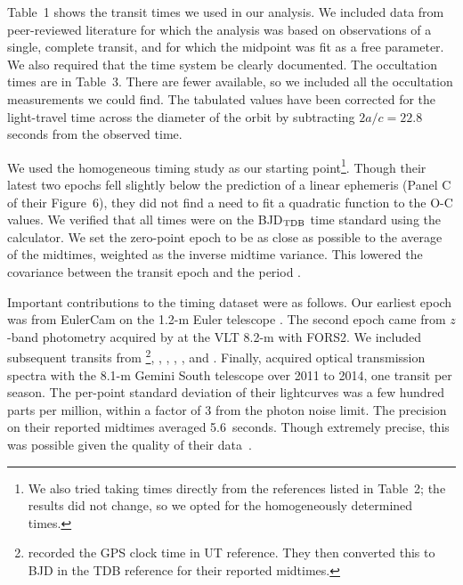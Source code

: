 \documentclass[12pt,twocolumn,tighten]{aastex62}
\begin{document}
Table~1 shows the transit times we used in our analysis.  We included
data from peer-reviewed literature for which the analysis was based on
observations of a single, complete transit, and for which the midpoint
was fit as a free parameter. We also required that the time system be
clearly documented.  The occultation times are in Table~3.  There are
fewer available, so we included all the occultation measurements we
could find. The tabulated values have been corrected for the
light-travel time across the diameter of the orbit by subtracting
$2a/c = 22.8$ seconds from the observed time.

We used the homogeneous \citet{hoyer_tramos_2013} timing study as our
starting point\footnote{We also tried taking times directly from the
references listed in Table~2; the results did not change, so we opted
for the homogeneously determined \citet{hoyer_tramos_2013} times.}.
Though their latest two epochs fell slightly below the prediction of a
linear ephemeris (Panel C of their Figure~6), they did not find a need
to fit a quadratic function to the O-C values.  We verified that all
times were on the BJD$_{\rm TDB}$ time standard using the
\citet{eastman_achieving_2010} calculator.  We set the zero-point
epoch to be as close as possible to the average of the midtimes,
weighted as the inverse midtime variance. This lowered the
covariance between the transit epoch and the period
\citep{gibson_gemini_2013}.

Important contributions to the timing dataset were as follows.  Our
earliest epoch was from EulerCam on the 1.2-m Euler telescope
\citep{wilson_wasp-4b_2008}.  The second epoch came from $z$-band
photometry acquired by \citet{gillon_improved_2009} at the VLT 8.2-m
with FORS2.  We included subsequent transits from
\citet{winn_transit_2009}\footnote{\citet{winn_transit_2009} recorded
the GPS clock time in UT reference. They then converted this to BJD in
the TDB reference for their reported midtimes.},
\citet{dragomir_terms_2011}, \citet{sanchis-ojeda_starspots_2011},
\citet{nikolov_wasp-4b_2012}, \citet{hoyer_tramos_2013}, and
\citet{ranjan_atmospheric_2014}.  Finally, \citet{huitson_gemini_2017}
acquired optical transmission spectra with the 8.1-m Gemini South
telescope over 2011 to 2014, one transit per season.  The per-point
standard deviation of their lightcurves was a few hundred parts per
million, within a factor of 3 from the photon noise limit.  The
precision on their reported midtimes averaged 5.6~seconds. Though
extremely precise, this was possible given the quality of their
data~\citep{carter_analytic_2008}.
\end{document}
